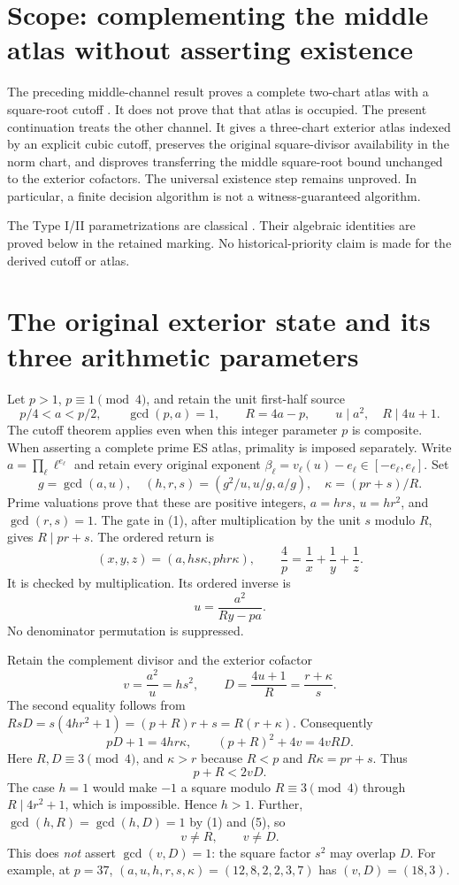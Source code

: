 \section{Scope: complementing the middle atlas without asserting existence}
The preceding middle-channel result proves a complete two-chart atlas with a
square-root cutoff \cite{Middle}. It does not prove that that atlas is occupied.
The present continuation treats the other channel. It gives a three-chart
exterior atlas indexed by an explicit cubic cutoff, preserves the original
square-divisor availability in the norm chart, and disproves transferring the
middle square-root bound unchanged to the exterior cofactors. The universal
existence step remains unproved. In particular, a finite decision algorithm is
not a witness-guaranteed algorithm.

The Type I/II parametrizations are classical \cite[\S2, Propositions 2.2 and
2.6]{ET}. Their algebraic identities are proved below in the retained marking.
No historical-priority claim is made for the derived cutoff or atlas.

\section{The original exterior state and its three arithmetic parameters}
Let $p>1$, $p\equiv1\pmod4$, and retain the unit first-half source
\[
 p/4<a<p/2,\qquad \gcd(p,a)=1,\qquad R=4a-p,
 \qquad u\mid a^2,\quad R\mid4u+1.                         \tag{1}
\]
The cutoff theorem applies even when this integer parameter $p$ is composite.
When asserting a complete prime ES atlas, primality is imposed separately.
Write $a=\prod_\ell\ell^{e_\ell}$ and retain every original exponent
$\beta_\ell=v_\ell(u)-e_\ell\in[-e_\ell,e_\ell]$.
Set
\[
 g=\gcd(a,u),\quad
 (h,r,s)=(g^2/u,u/g,a/g),\quad
 \kappa=(pr+s)/R.                                        \tag{2}
\]
Prime valuations prove that these are positive integers, $a=hrs$, $u=hr^2$,
and $\gcd(r,s)=1$. The gate in (1), after multiplication by the unit $s$ modulo
$R$, gives $R\mid pr+s$. The ordered return is
\[
 \boxed{(x,y,z)=(a,hs\kappa,phr\kappa),\qquad
 \frac4p=\frac1x+\frac1y+\frac1z.}                       \tag{3}
\]
It is checked by multiplication. Its ordered inverse is
\[
 u=\frac{a^2}{Ry-pa}.
\]
No denominator permutation is suppressed.

Retain the complement divisor and the exterior cofactor
\[
 \boxed{v=\frac{a^2}{u}=hs^2,\qquad
 D=\frac{4u+1}{R}=\frac{r+\kappa}{s}.}                   \tag{4}
\]
The second equality follows from
$RsD=s(4hr^2+1)=(p+R)r+s=R(r+\kappa)$.
Consequently
\[
 \boxed{pD+1=4hr\kappa,\qquad
 (p+R)^2+4v=4vRD.}                                     \tag{5}
\]
Here $R,D\equiv3\pmod4$, and $\kappa>r$ because $R<p$ and
$R\kappa=pr+s$. Thus
\[
 \boxed{p+R<2vD.}                                       \tag{6}
\]
The case $h=1$ would make $-1$ a square modulo $R\equiv3\pmod4$ through
$R\mid4r^2+1$, which is impossible. Hence $h>1$. Further,
$\gcd(h,R)=\gcd(h,D)=1$ by (1) and (5), so
\[
 \boxed{v\ne R,\qquad v\ne D.}                         \tag{7}
\]
This does \emph{not} assert $\gcd(v,D)=1$: the square factor $s^2$ may overlap
$D$. For example, at $p=37$, $(a,u,h,r,s,\kappa)=(12,8,2,2,3,7)$ has
$(v,D)=(18,3)$.

